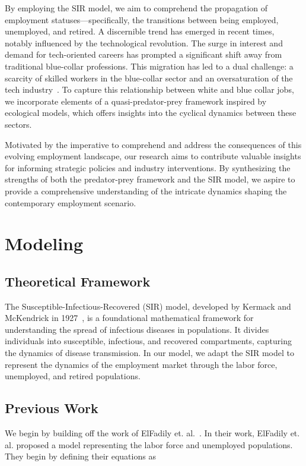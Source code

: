 \documentclass[11pt]{amsart}
\begin{document}
By employing the SIR model, we aim to comprehend the propagation of employment statuses—specifically, 
the transitions between being employed, unemployed, and retired. A discernible trend has emerged in recent times, 
notably influenced by the technological revolution. The surge in interest and demand for tech-oriented careers 
has prompted a significant shift away from traditional blue-collar professions. This migration has led to a 
dual challenge: a scarcity of skilled workers in the blue-collar sector and an oversaturation of the tech 
industry~\cite{SHRMBlueCollarDrought}. To capture this relationship between white and blue collar jobs, we incorporate elements of a quasi-predator-prey 
framework inspired by ecological models, which offers insights into the cyclical dynamics between these sectors. 

Motivated by the imperative to comprehend and address the consequences of this evolving employment landscape, 
our research aims to contribute valuable insights for informing strategic policies and industry interventions. 
By synthesizing the strengths of both the predator-prey framework and the SIR model, we aspire to provide a 
comprehensive understanding of the intricate dynamics shaping the contemporary employment scenario.

\section{Modeling}

\subsection{Theoretical Framework}

The Susceptible-Infectious-Recovered (SIR) model, developed by Kermack and McKendrick in 1927~\cite{kermack1927contribution}, 
is a foundational mathematical framework for understanding the spread of infectious diseases in populations. 
It divides individuals into susceptible, infectious, and recovered compartments, capturing the dynamics of disease transmission.
In our model, we adapt the SIR model to represent the dynamics of the employment market through the labor force,
unemployed, and retired populations.

\subsection{Previous Work}

We begin by building off the work of ElFadily et. al.~\cite{ElFadily}. In their work, ElFadily et. al. proposed a model
 representing the labor force and unemployed populations. They begin by defining their equations as
\end{document}

